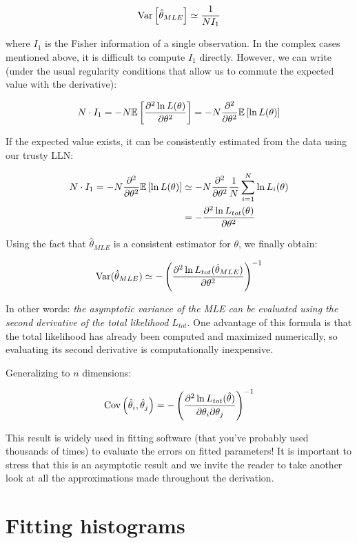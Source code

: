 	\[
		\operatorname{Var}\left[\hat\theta_{MLE}\right]\simeq\frac{1}{NI_1}
	\]
	
where $I_1$ is the Fisher information of a single observation. 
In the complex cases mentioned above, it is difficult to compute $I_1$ directly. However, we can write (under the usual regularity conditions that allow us to commute the expected value with the derivative):

	\[
		N \cdot I_1= -N\mathbb{E}\left[\frac{\partial^2\ln L(\theta)}{\partial\theta^2}\right]=-N\frac{\partial^2}{\partial\theta^2}\mathbb{E}\left[\ln L(\theta)\right]
	\]
	
If the expected value exists, it can be consistently estimated from the data using our trusty LLN:

\begin{align*}
	N \cdot I_1=-N\frac{\partial^2}{\partial\theta^2}\mathbb{E}\left[\ln L(\theta)\right]	&\simeq -N \frac{\partial^2}{\partial\theta^2} \frac{1}{N}\sum_{i=1}^N\ln L_i(\theta) \\
	&= -\frac{\partial^2\ln L_{tot}(\theta)}{\partial\theta^2}
\end{align*}

	Using the fact that $\hat\theta_{MLE}$ is a consistent estimator for $\theta$, we finally obtain:
	
	\[
		 \operatorname{Var}(\hat\theta_{MLE})\simeq-\left(\frac{\partial^2\ln L_{tot}(\hat\theta_{MLE})}{\partial\theta^2}\right)^{-1}
	\]
	
In other words: \emph{the asymptotic variance of the MLE can be evaluated using the second derivative of the total likelihood $L_{tot}$}. 
One advantage of this formula is that the total likelihood has already been computed and maximized numerically, so evaluating its second derivative is computationally inexpensive.

Generalizing to $n$ dimensions:

	\[
		\operatorname{Cov}\left(\hat{\theta}_i,\hat{\theta}_j\right)=-\left(\frac{\partial^2\ln L_{tot}(\hat{\theta})}{\partial\theta_i\partial\theta_j}\right)^{-1}
	\]
	
This result is widely used in fitting software (that you've probably used thousands of times) to evaluate the errors on fitted parameters!
It is important to stress that this is an asymptotic result and we invite the reader to take another look at all the approximations made throughout the derivation.

\section{Fitting histograms}

